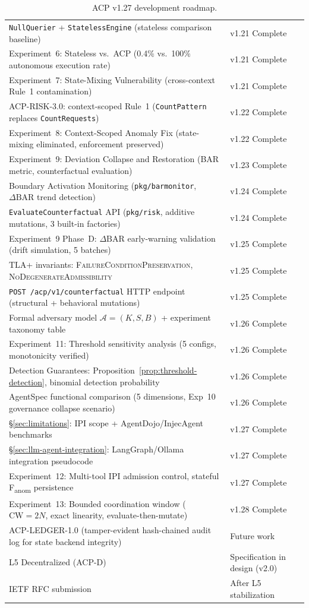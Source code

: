 \documentclass[11pt]{article}
\theoremstyle{definition}
\begin{document}
\begin{table}[h!]
\begin{tabular}{@{}ll@{}}
\texttt{NullQuerier} + \texttt{StatelessEngine} (stateless comparison baseline) & v1.21 Complete \\
Experiment~6: Stateless vs.\ ACP (0.4\% vs.\ 100\% autonomous execution rate) & v1.21 Complete \\
Experiment~7: State-Mixing Vulnerability (cross-context Rule~1 contamination) & v1.21 Complete \\
ACP-RISK-3.0: context-scoped Rule~1 (\texttt{CountPattern} replaces \texttt{CountRequests}) & v1.22 Complete \\
Experiment~8: Context-Scoped Anomaly Fix (state-mixing eliminated, enforcement preserved) & v1.22 Complete \\
Experiment~9: Deviation Collapse and Restoration (BAR metric, counterfactual evaluation) & v1.23 Complete \\
Boundary Activation Monitoring (\texttt{pkg/barmonitor}, $\Delta\mathrm{BAR}$ trend detection) & v1.24 Complete \\
\texttt{EvaluateCounterfactual} API (\texttt{pkg/risk}, additive mutations, 3 built-in factories) & v1.24 Complete \\
Experiment~9 Phase~D: $\Delta\mathrm{BAR}$ early-warning validation (drift simulation, 5 batches) & v1.25 Complete \\
TLA+ invariants: \textsc{FailureConditionPreservation}, \textsc{NoDegenerateAdmissibility} & v1.25 Complete \\
\texttt{POST /acp/v1/counterfactual} HTTP endpoint (structural + behavioral mutations) & v1.25 Complete \\
Formal adversary model $\mathcal{A}=(K,S,B)$ + experiment taxonomy table & v1.26 Complete \\
Experiment~11: Threshold sensitivity analysis (5 configs, monotonicity verified) & v1.26 Complete \\
Detection Guarantees: Proposition~\ref{prop:threshold-detection}, binomial detection probability & v1.26 Complete \\
AgentSpec functional comparison (5 dimensions, Exp~10 governance collapse scenario) & v1.26 Complete \\
\S\ref{sec:limitations}: IPI scope + AgentDojo/InjecAgent benchmarks & v1.27 Complete \\
\S\ref{sec:llm-agent-integration}: LangGraph/Ollama integration pseudocode & v1.27 Complete \\
Experiment~12: Multi-tool IPI admission control, stateful F\textsubscript{anom} persistence & v1.27 Complete \\
Experiment~13: Bounded coordination window ($\mathrm{CW}=2N$, exact linearity, evaluate-then-mutate) & v1.28 Complete \\
ACP-LEDGER-1.0 (tamper-evident hash-chained audit log for state backend integrity) & Future work \\
L5 Decentralized (ACP-D) & Specification in design (v2.0) \\
IETF RFC submission & After L5 stabilization \\
\bottomrule
\end{tabular}
\caption{ACP v1.27 development roadmap.}
\label{tab:roadmap}
\end{table}
\end{document}
